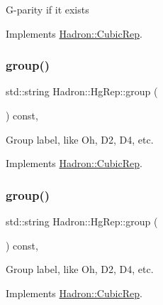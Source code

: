 G-\/parity if it exists 

Implements \mbox{\hyperlink{structHadron_1_1CubicRep_a52104e43266d1614c00bbd1c3b395458}{Hadron\+::\+Cubic\+Rep}}.

\mbox{\label{structHadron_1_1HgRep_a271e1ec9a6f40512f32c8c573e42dff7}} 
\subsubsection{\texorpdfstring{group()}{group()}\hspace{0.1cm}{\footnotesize\ttfamily [1/2]}}
{\footnotesize\ttfamily std\+::string Hadron\+::\+Hg\+Rep\+::group (\begin{DoxyParamCaption}{ }\end{DoxyParamCaption}) const\hspace{0.3cm}{\ttfamily [inline]}, {\ttfamily [virtual]}}

Group label, like Oh, D2, D4, etc. 

Implements \mbox{\hyperlink{structHadron_1_1CubicRep_a0748f11ec87f387062c8e8981339a29c}{Hadron\+::\+Cubic\+Rep}}.

\mbox{\label{structHadron_1_1HgRep_a271e1ec9a6f40512f32c8c573e42dff7}} 
\subsubsection{\texorpdfstring{group()}{group()}\hspace{0.1cm}{\footnotesize\ttfamily [2/2]}}
{\footnotesize\ttfamily std\+::string Hadron\+::\+Hg\+Rep\+::group (\begin{DoxyParamCaption}{ }\end{DoxyParamCaption}) const\hspace{0.3cm}{\ttfamily [inline]}, {\ttfamily [virtual]}}

Group label, like Oh, D2, D4, etc. 

Implements \mbox{\hyperlink{structHadron_1_1CubicRep_a0748f11ec87f387062c8e8981339a29c}{Hadron\+::\+Cubic\+Rep}}.

\mbox{\label{structHadron_1_1HgRep_a56e901b36f34730192413d29c8c4c4a5}} 
